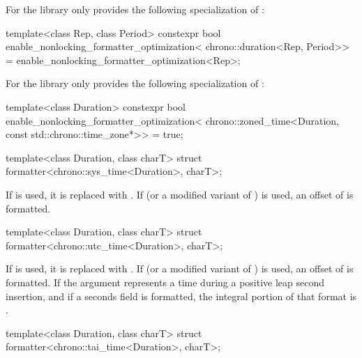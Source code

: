\pnum
For 
the library only provides the following specialization
of :
\begin{codeblock}
template<class Rep, class Period>
  constexpr bool enable_nonlocking_formatter_optimization<
    chrono::duration<Rep, Period>> =
      enable_nonlocking_formatter_optimization<Rep>;
\end{codeblock}

\pnum
For 
the library only provides the following specialization of
:
\begin{codeblock}
template<class Duration>
  constexpr bool enable_nonlocking_formatter_optimization<
    chrono::zoned_time<Duration, const std::chrono::time_zone*>> = true;
\end{codeblock}

%
\begin{itemdecl}
template<class Duration, class charT>
  struct formatter<chrono::sys_time<Duration>, charT>;
\end{itemdecl}

\begin{itemdescr}
\pnum
\remarks
If  is used,
it is replaced with .
If  (or a modified variant of ) is used,
an offset of  is formatted.
\end{itemdescr}

%
\begin{itemdecl}
template<class Duration, class charT>
  struct formatter<chrono::utc_time<Duration>, charT>;
\end{itemdecl}

\begin{itemdescr}
\pnum
\remarks
If  is used,
it is replaced with .
If  (or a modified variant of ) is used,
an offset of  is formatted.
If the argument represents a time during a positive leap second insertion,
and if a seconds field is formatted,
the integral portion of that format is
.
\end{itemdescr}

%
\begin{itemdecl}
template<class Duration, class charT>
  struct formatter<chrono::tai_time<Duration>, charT>;
\end{itemdecl}

